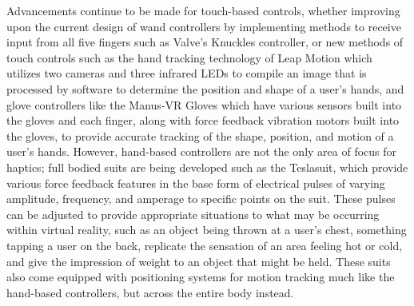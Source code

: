 \documentclass{article}
\begin{document}
Advancements continue to be made for touch-based controls, whether improving upon the current design of wand controllers by implementing methods to receive input from all five fingers such as Valve's Knuckles controller\cite{article3cite}, or new methods of touch controls such as the hand tracking technology of Leap Motion\cite{article4cite} which utilizes two cameras and three infrared LEDs\cite{article4cite} to compile an image that is processed by software to determine the position and shape of a user's hands, and glove controllers like the Manus-VR Gloves\cite{article5cite} which have various sensors built into the gloves and each finger, along with force feedback vibration motors built into the gloves, to provide accurate tracking of the shape, position, and motion of a user's hands. However, hand-based controllers are not the only area of focus for haptics; full bodied suits are being developed such as the Teslasuit\cite{article6cite}, which provide various force feedback features in the base form of electrical pulses of varying amplitude, frequency, and amperage to specific points on the suit\cite{article6cite}. These pulses can be adjusted to provide appropriate situations to what may be occurring within virtual reality, such as an object being thrown at a user's chest, something tapping a user on the back, replicate the sensation of an area feeling hot or cold, and give the impression of weight to an object that might be held. These suits also come equipped with positioning systems for motion tracking much like the hand-based controllers, but across the entire body instead. \\ \\
\end{document}
